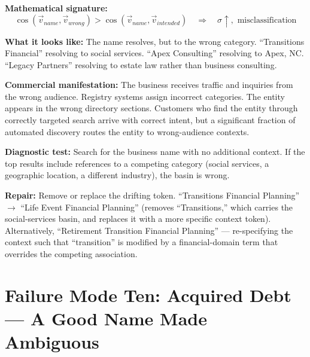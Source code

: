 \documentclass[12pt, openany]{book}
\theoremstyle{thmstyle}
\theoremstyle{defstyle}
\begin{document}
\begin{failbox}
\textbf{Mathematical signature:}
\[
\cos(\vec{v}_{name}, \vec{v}_{wrong}) > \cos(\vec{v}_{name}, \vec{v}_{intended}) \quad \Rightarrow \quad \sigma \uparrow, \text{ misclassification}
\]

\textbf{What it looks like:} The name resolves, but to the wrong category. ``Transitions Financial'' resolving to social services. ``Apex Consulting'' resolving to Apex, NC. ``Legacy Partners'' resolving to estate law rather than business consulting.

\textbf{Commercial manifestation:} The business receives traffic and inquiries from the wrong audience. Registry systems assign incorrect categories. The entity appears in the wrong directory sections. Customers who find the entity through correctly targeted search arrive with correct intent, but a significant fraction of automated discovery routes the entity to wrong-audience contexts.

\textbf{Diagnostic test:} Search for the business name with no additional context. If the top results include references to a competing category (social services, a geographic location, a different industry), the basin is wrong.

\textbf{Repair:} Remove or replace the drifting token. ``Transitions Financial Planning'' $\to$ ``Life Event Financial Planning'' (removes ``Transitions,'' which carries the social-services basin, and replaces it with a more specific context token). Alternatively, ``Retirement Transition Financial Planning'' --- re-specifying the context such that ``transition'' is modified by a financial-domain term that overrides the competing association.
\end{failbox}

\section{Failure Mode Ten: Acquired Debt --- A Good Name Made Ambiguous}
\end{document}
